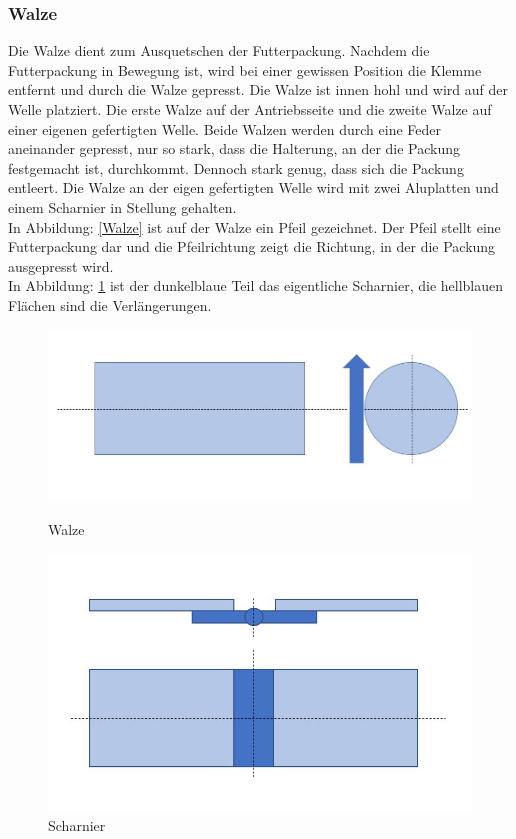 \subsubsection{Walze}

Die Walze dient zum Ausquetschen der Futterpackung. Nachdem die Futterpackung in Bewegung ist, wird bei einer gewissen Position die Klemme entfernt und durch die Walze gepresst. Die Walze ist innen hohl und wird auf der Welle platziert. Die erste Walze auf der Antriebsseite und die zweite Walze auf einer eigenen gefertigten Welle. Beide Walzen werden durch eine Feder aneinander gepresst, nur so stark, dass die Halterung, an der die Packung festgemacht ist, durchkommt. Dennoch stark genug, dass sich die Packung entleert. Die Walze an der eigen gefertigten Welle wird mit zwei Aluplatten und einem Scharnier in Stellung gehalten.\\ 
In Abbildung: \ref{Walze} ist auf der Walze ein Pfeil gezeichnet. Der Pfeil stellt eine Futterpackung dar und die Pfeilrichtung zeigt die Richtung, in der die Packung ausgepresst wird.  \\
In Abbildung: \ref{Scharnier} ist der dunkelblaue Teil das eigentliche Scharnier, die hellblauen Flächen sind die Verlängerungen. 

\begin{figure}[H]
   \begin{minipage}[hbt]{.4\linewidth} %
      \includegraphics[width=\linewidth]{Bilder/Powerpoint/Walze}
      \caption{Walze}
      \label{Walze}
   \end{minipage}
   \hspace{.2\linewidth}%
   \begin{minipage}[hbt]{.4\linewidth} %
      \includegraphics[width=\linewidth]{Bilder/Powerpoint/Schanier}
      \caption{Scharnier}
	  \label{Scharnier}      
      \end{minipage}
\end{figure}
\newpage
